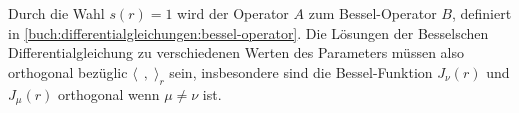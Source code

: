 Durch die Wahl $s(r)=1$ wird der Operator $A$ zum Bessel-Operator
$B$, definiert in
\eqref{buch:differentialgleichungen:bessel-operator}.
Die Lösungen der Besselschen Differentialgleichung zu verschiedenen Werten
des Parameters müssen also orthogonal bezüglic $\langle\,\;,\;\rangle_r$
sein, insbesondere sind die
Bessel-Funktion $J_\nu(r)$ und $J_\mu(r)$ orthogonal wenn $\mu\ne\nu$ ist.

